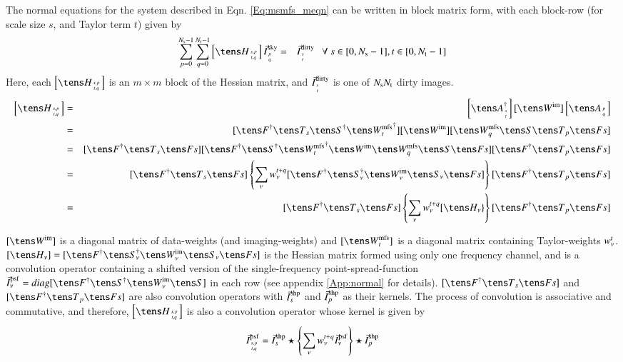 \documentclass[11pt,a4paper,variablewidth]{article}
\begin{document}
The normal equations 
for the system described in Eqn. \ref{Eq:msmfs_meqn}
can be written in block matrix form, with each block-row 
(for scale size $s$, and Taylor term $t$) given by
\begin{eqnarray}
\label{Eq:msmfs_neqn_1}
\sum_{p=0}^{\Ns -1}\sum_{q=0}^{\Nt -1} \left[\He_{{s,p}\atop{t,q}}\right] \vec{I}^{\rm sky}_{{p}\atop{q}} &=& \vec{I}^{\rm dirty}_{{s}\atop{t}}~~~  \forall~ s \in [0,\Ns -1], t\in[0,\Nt -1]
\end{eqnarray}
Here, each $\left[\He_{{s,p}\atop{t,q}} \right]$ is an $m\times m$ block of the 
Hessian matrix, and $\vec{I}^{\rm dirty}_{{s}\atop{t}}$ is one of $N_{\rm s}  N_{\rm t} $ dirty images.
\begin{eqnarray}
\left[\He_{{s,p}\atop{t,q}} \right] &=& \left[\A_{{s}\atop{t}}^{\dag}\right][\Wim] \left[\A_{{p}\atop{q}}\right] \\
 &=&    [\Fd \T_s  \Sd \Wntd ]  [\Wim]  [\W^{\rm mfs}_q \Sa \T_p \F] \\
 &=&    [\Fd \T_s \F] [\Fd  \Sd \Wntd  \Wim  \W^{\rm mfs}_q \Sa  \F] [\Fd \T_p \F]\\
 &=& [\Fd \T_s \F] \left\{  \sum_{\nu} \wntq [\Fd\Snd\Wimn\Sna\F] \right\} [\Fd \T_p \F] \\
 &=& [\Fd \T_s \F] \left\{  \sum_{\nu} \wntq [\He_{\nu}\} \right\} [\Fd \T_p \F] 
\end{eqnarray}

$[\Wim]$ is a diagonal matrix of data-weights (and imaging-weights) and  
$[\W^{\rm mfs}_t]$ is a diagonal matrix containing Taylor-weights ${w_{\nu}^t}$.
$[\He_{\nu}] =  [\Fd\Snd\Wimn\Sna\F]$ is the Hessian matrix formed using only one
 frequency channel, and
is a convolution operator containing a shifted version of the single-frequency 
point-spread-function $\I^{\rm psf}_{\nu} = diag[\Fd \Sd \Wimn \Sa]$ in each row 
(see appendix \ref{App:normal} for details).
$[\Fd \T_s\F]$ and $[\Fd\T_p\F]$ are also convolution operators 
with ${\vec{I}}^{\rm shp}_s$ and ${\vec{I}}^{\rm shp}_p$ as their kernels. 
The process of convolution is associative and commutative, and 
therefore, $\left[\He_{{s,p}\atop{t,q}}\right]$  is also a convolution operator 
whose kernel is given by 
\begin{equation}
\label{Eq:msmfs_neqn_2.5}
\vec{I}^{\rm psf}_{{s,p}\atop{t,q}} = {\vec{I}}^{\rm shp}_s  \star \left\{ \sum_{\nu} {w_{\nu}^{t+q}} \vec{I}^{\rm psf}_{\nu} \right\} \star {\vec{I}}^{\rm shp}_p 
\end{equation}
\end{document}
